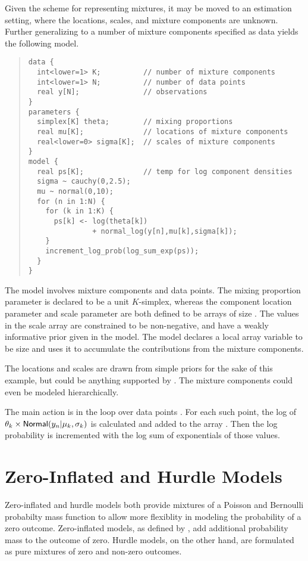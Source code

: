 Given the scheme for representing mixtures, it may be moved to an
estimation setting, where the locations, scales, and mixture
components are unknown.  Further generalizing to a number of mixture
components specified as data yields the following model.
%
\begin{quote}
\begin{Verbatim}[fontsize=\small]
data {
  int<lower=1> K;          // number of mixture components
  int<lower=1> N;          // number of data points
  real y[N];               // observations
}
parameters {
  simplex[K] theta;        // mixing proportions
  real mu[K];              // locations of mixture components
  real<lower=0> sigma[K];  // scales of mixture components
}
model {
  real ps[K];              // temp for log component densities
  sigma ~ cauchy(0,2.5);
  mu ~ normal(0,10);
  for (n in 1:N) {
    for (k in 1:K) {
      ps[k] <- log(theta[k]) 
               + normal_log(y[n],mu[k],sigma[k]);
    }
    increment_log_prob(log_sum_exp(ps));
  }
}
\end{Verbatim}
\end{quote}
%
The model involves  mixture components and  data
points. The mixing proportion parameter  is declared to be
a unit $K$-simplex, whereas the component location parameter 
and scale parameter  are both defined to be arrays of size
. The values in the scale array  are constrained
to be non-negative, and have a weakly informative prior given in the
model. The model declares a local array variable  to be size
 and uses it to accumulate the contributions from the mixture
components.

The locations and scales are drawn from simple priors for the sake of
this example, but could be anything supported by \Stan.  The mixture
components  could even be modeled hierarchically.

The main action is in the loop over data points .  For each
such point, the log of $\theta_k \times
\mbox{\sf Normal}(y_n|\mu_k,\sigma_k)$ is calculated and added to the
array .  Then the log probability is incremented with the log
sum of exponentials of those values.


\section{Zero-Inflated and Hurdle Models}\label{zero-inflated.section}

Zero-inflated and hurdle models both provide mixtures of a Poisson and
Bernoulli probabilty mass function to allow more flexiblity in
modeling the probability of a zero outcome.  Zero-inflated models, as
defined by \citet{Lambert:1992}, add additional probability mass to
the outcome of zero.  Hurdle models, on the other hand, are formulated
as pure mixtures of zero and non-zero outcomes.  

